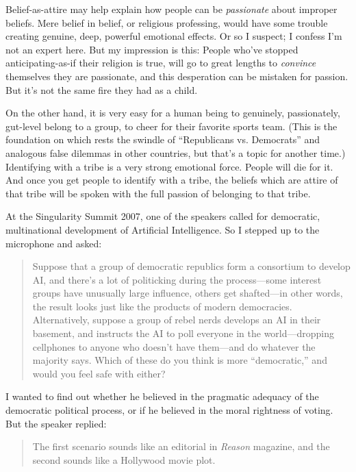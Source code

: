 {
 Belief-as-attire may help explain how people can be
\textit{passionate} about improper beliefs. Mere belief in belief, or
religious professing, would have some trouble creating genuine, deep,
powerful emotional effects. Or so I suspect; I confess
I'm not an expert here. But my impression is this:
People who've stopped anticipating-as-if their religion
is true, will go to great lengths to \textit{convince} themselves they
are passionate, and this desperation can be mistaken for passion. But
it's not the same fire they had as a child.}

{
 On the other hand, it is very easy for a human being to genuinely,
passionately, gut-level belong to a group, to cheer for their favorite
sports team. (This is the foundation on which rests the swindle of
``Republicans vs. Democrats'' and
analogous false dilemmas in other countries, but that's
a topic for another time.) Identifying with a tribe is a very strong
emotional force. People will die for it. And once you get people to
identify with a tribe, the beliefs which are attire of that tribe will
be spoken with the full passion of belonging to that tribe.}

\myendsectiontext


{
 At the Singularity Summit 2007, one of the speakers called for
democratic, multinational development of Artificial Intelligence. So I
stepped up to the microphone and asked:}

\begin{quote}
{
 Suppose that a group of democratic republics form a consortium to
develop AI, and there's a lot of politicking during the
process---some interest groups have unusually large influence, others
get shafted---in other words, the result looks just like the products
of modern democracies. Alternatively, suppose a group of rebel nerds
develops an AI in their basement, and instructs the AI to poll everyone
in the world---dropping cellphones to anyone who
doesn't have them---and do whatever the majority says.
Which of these do you think is more
``democratic,'' and would you feel
safe with either?}
\end{quote}

{
 I wanted to find out whether he believed in the pragmatic adequacy
of the democratic political process, or if he believed in the moral
rightness of voting. But the speaker replied:}

\begin{quote}
{
 The first scenario sounds like an editorial in \textit{Reason}
 magazine, and the second sounds like a Hollywood movie plot.}
\end{quote}


